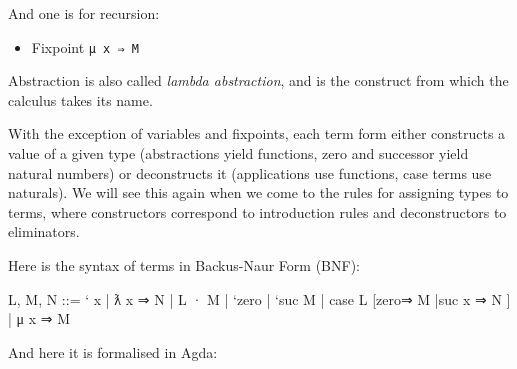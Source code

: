 And one is for recursion:

\begin{itemize}
\tightlist
\item
  Fixpoint \texttt{μ\ x\ ⇒\ M}
\end{itemize}

Abstraction is also called \emph{lambda abstraction}, and is the
construct from which the calculus takes its name.

With the exception of variables and fixpoints, each term form either
constructs a value of a given type (abstractions yield functions, zero
and successor yield natural numbers) or deconstructs it (applications
use functions, case terms use naturals). We will see this again when we
come to the rules for assigning types to terms, where constructors
correspond to introduction rules and deconstructors to eliminators.

Here is the syntax of terms in Backus-Naur Form (BNF):

\begin{myDisplay}
L, M, N  ::=
  ` x  |  ƛ x ⇒ N  |  L · M  |
  `zero  |  `suc M  |  case L [zero⇒ M |suc x ⇒ N ]  |
  μ x ⇒ M
\end{myDisplay}

And here it is formalised in Agda:

